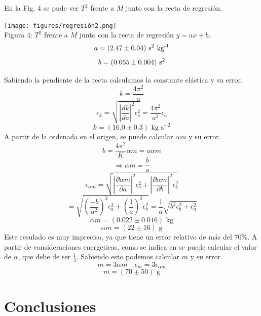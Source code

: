 \documentclass{article}
\begin{document}
\begin{multicols}{2}
En la Fig. 4 se pude ver $T^2$ frente a $M$ junto con la recta de regresión.
\begin{center}
  \texttt{[image: figures/regresión2.png]}\\
  Figura 4: $T^2$ frente a $M$ junto con la recta de regresión $y = ax+b$.
  $$
  a = (2.47 \pm 0.04) \text{ s\textsuperscript{2} kg\textsuperscript{-1}}
  $$
  $$
  b = (0.055 \pm 0.004) \text{ s\textsuperscript{2}}
  $$
\end{center}
Sabiendo la pendiente de la recta calculamos la constante elástica y su error.
$$
k = \frac{4\pi^2}{a}
$$
$$
\epsilon_k = \sqrt{\left| \frac{dk}{da} \right|^2 \epsilon_a^2} = \frac{4\pi^2}{a^2} \epsilon_a
$$
$$
k= (16.0 \pm 0.3) \text{ kg s}^{-2}
$$
A partir de la ordenada en el origen, se puede calcular $\alpha m$ y su error.
$$
b = \frac{4\pi^2}{K} \alpha m = a \alpha m
$$
$$
\Rightarrow \alpha m = \frac{b}{a}
$$
$$
\epsilon_{\alpha m} = \sqrt{\left| \frac{\partial \alpha m}{\partial a} \right|^2 \epsilon_a^2 + \left| \frac{\partial \alpha m}{\partial b} \right|^2 \epsilon_b^2}
$$
$$
= \sqrt{\left(\frac{-b}{a^2}\right)^2 \epsilon_a^2 + \left( \frac{1}{a}\right)^2 \epsilon_b^2} = 
\frac{1}{a}\sqrt{b^2 \epsilon_b^2 + \epsilon_a^2}
$$
$$
\alpha m = (0.022 \pm 0.016) \text{ kg}
$$
$$
\alpha m = (22 \pm 16) \text{ g}
$$
Este resulado es muy impreciso, ya que tiene un error relativo de más del 70\%. A partir de consideraciones energeticas, como se indica en \cite{web} se puede calcular el valor de $\alpha$, que debe de ser $\frac{1}{3}$. Sabiendo esto podemos calcular $m$ y su error.
$$
m = 3 \alpha m \quad \epsilon_m = 3 \epsilon_{\alpha m}
$$
$$
m = (70 \pm 50) \text{ g}
$$
\section*{Conclusiones}


\end{multicols}
\end{document}
